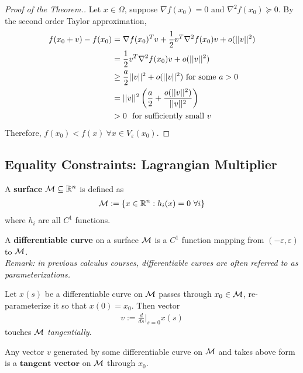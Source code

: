 \documentclass{article}
\begin{document}
   	\begin{proof}[Proof of the Theorem.]
   		Let $x \in \Omega$, suppose $\nabla f(x_0) = 0$ and $\nabla^2 f(x_0) \succcurlyeq 0$. By the second order Taylor approximation,
   		\begin{align}
   			f(x_0 + v) - f(x_0) &= \nabla f(x_0)^T v + \frac{1}{2} v^T \nabla^2 f(x_0) v + o(\vert \vert {v} \vert \vert^2) \\
   			&= \frac{1}{2} v^T \nabla^2 f(x_0) v + o(\vert \vert {v} \vert \vert^2) \\
   			&\geq \frac{a}{2} \vert \vert {v} \vert \vert^2 + o(\vert \vert {v} \vert \vert^2) \text{{ for some }}a > 0 \\
   			&= \vert \vert {v} \vert \vert^2 \left (
   			\frac{a}{2} + \frac{o(\vert \vert {v} \vert \vert^2)}{\vert \vert {v} \vert \vert^2} \right) \\
   			&>0\ \text{{ for sufficiently small }} v
   		\end{align}
   		Therefore, $f(x_0) < f(x)\ \forall x \in V_\varepsilon(x_0)$.
   	\end{proof}
   	
   	\subsection{Equality Constraints: Lagrangian Multiplier}
   	\begin{definition}
   		A \textbf{surface} $\mathcal{{M}} \subseteq \mathbb{R}^n$ is defined as
   		\begin{align}
   			\mathcal{{M}} := \left \{
   			x \in \mathbb{R}^n : h_i (x) = 0\ \forall i
   			\right \}
   		\end{align}
   		where $h_i$ are all $C^1$ functions.
   	\end{definition}
   	
   	\begin{definition}
   		A \textbf{differentiable curve} on a surface $\mathcal{{M}}$ is a $C^1$ function mapping from $(-\varepsilon, \varepsilon)$ to $\mathcal{{M}}$. \\
   		\emph{Remark: in previous calculus courses, differentiable curves are often referred to as parameterizations.}
   	\end{definition}
   	Let $x(s)$ be a differentiable curve on $\mathcal{{M}}$ passes through $x_0 \in \mathcal{{M}}$, re-parameterize it so that $x(0) = x_0$. Then vector
   	\begin{align}
   		v := \frac{d}{ds} \bigg \vert_{s=0} x(s)
   	\end{align}
   	touches $\mathcal{{M}}$ \emph{tangentially}.
   	
   	\begin{definition}
   		Any vector $v$ generated by some differentiable curve on $\mathcal{{M}}$ and takes above form is a $\textbf{tangent vector}$ on $\mathcal{{M}}$ through $x_0$.
   	\end{definition}
   	
\end{document}
